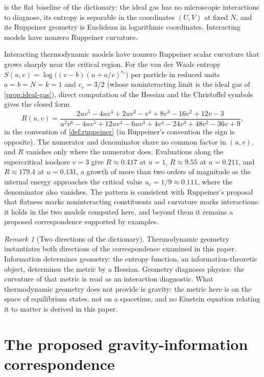 \documentclass[11pt,letterpaper]{article}
\theoremstyle{definition}
\theoremstyle{remark}
\newtheorem{remark}[theorem]{Remark}
\begin{document}
 is the flat baseline of the dictionary: the ideal gas has no microscopic interactions to diagnose, its entropy is separable in the coordinates $(U, V)$ at fixed $N$, and its Ruppeiner geometry is Euclidean in logarithmic coordinates. Interacting models have nonzero Ruppeiner curvature.

Interacting thermodynamic models have nonzero Ruppeiner scalar curvature that grows sharply near the critical region. For the van der Waals entropy $S(u, v) = \log\bigl((v - b)(u + a/v)^{c_v}\bigr)$ per particle in reduced units $a = b = N = k = 1$ and $c_v = 3/2$ (whose noninteracting limit is the ideal gas of \cref{prop:ideal-gas}), direct computation of the Hessian and the Christoffel symbols gives the closed form
\begin{equation}
\label{eq:vdw-curvature}
R(u, v) = \frac{2uv^5 - 4uv^4 + 2uv^3 - v^4 + 8v^3 - 16v^2 + 12v - 3}{u^2 v^6 - 4uv^5 + 12uv^4 - 6uv^3 + 4v^4 - 24v^3 + 48v^2 - 36v + 9},
\end{equation}
in the convention of \cref{def:ruppeiner} (in Ruppeiner's convention the sign is opposite). The numerator and denominator share no common factor in $(u, v)$, and $R$ vanishes only where the numerator does. Evaluations along the supercritical isochore $v = 3$ give $R \approx 0.417$ at $u = 1$, $R \approx 9.55$ at $u = 0.211$, and $R \approx 179.4$ at $u = 0.131$, a growth of more than two orders of magnitude as the internal energy approaches the critical value $u_c = 1/9 \approx 0.111$, where the denominator also vanishes. The pattern is consistent with Ruppeiner's proposal that flatness marks noninteracting constituents and curvature marks interactions: it holds in the two models computed here, and beyond them it remains a proposed correspondence supported by examples.

\begin{remark}[Two directions of the dictionary]
\label{rem:dictionary}
Thermodynamic geometry instantiates both directions of the correspondence examined in this paper. Information determines geometry: the entropy function, an information-theoretic object, determines the metric by a Hessian. Geometry diagnoses physics: the curvature of that metric is read as an interaction diagnostic. What thermodynamic geometry does not provide is gravity: the metric here is on the space of equilibrium states, not on a spacetime, and no Einstein equation relating it to matter is derived in this paper.
\end{remark}

\section{The proposed gravity-information correspondence}
\label{sec:correspondence}
\end{document}
